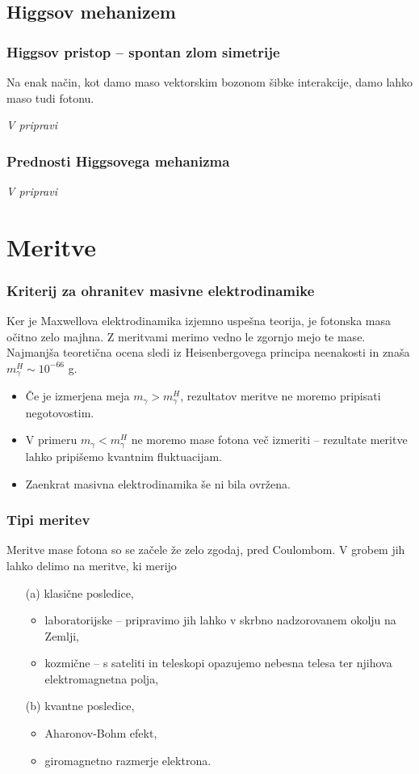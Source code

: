 \documentclass{beamer}
\begin{document}
\subsection{Higgsov mehanizem}

\begin{frame}[t]
	\frametitle{Higgsov pristop -- spontan zlom simetrije}
	Na enak način, kot damo maso vektorskim bozonom šibke interakcije, damo lahko maso tudi fotonu.
	

	\emph{V pripravi}
\end{frame}

\begin{frame}[t]
	\frametitle{Prednosti Higgsovega mehanizma}
	\emph{V pripravi}
\end{frame}

\section{Meritve}

\begin{frame}[t]
	\frametitle{Kriterij za ohranitev masivne elektrodinamike}
	Ker je Maxwellova elektrodinamika izjemno uspešna teorija, je fotonska masa očitno zelo majhna. Z meritvami merimo vedno
	le zgornjo mejo te mase. Najmanjša teoretična ocena sledi iz Heisenbergovega principa neenakosti in znaša $m^H_\gamma \sim 10^{-66}$ g.
	\begin{itemize}
		\item{Če je izmerjena meja $m_\gamma > m^H_\gamma$, rezultatov meritve ne moremo pripisati negotovostim.}
		\item{V primeru $m_\gamma < m^H_\gamma$ ne moremo mase fotona več izmeriti -- rezultate meritve lahko
			pripišemo kvantnim fluktuacijam.}
		\item{Zaenkrat masivna elektrodinamika še ni bila ovržena.}
	\end{itemize}
\end{frame}

\begin{frame}[t]
	\frametitle{Tipi meritev}
	Meritve mase fotona so se začele že zelo zgodaj, pred Coulombom. V grobem jih lahko delimo na meritve, ki merijo
	\begin{itemize}
		\item[(a)]{klasične posledice,}
			\begin{itemize}
				\item{laboratorijske -- pripravimo jih lahko v skrbno nadzorovanem okolju na Zemlji,}
				\item{kozmične -- s sateliti in teleskopi opazujemo nebesna telesa ter njihova elektromagnetna polja,}
			\end{itemize}
		\item[(b)]{kvantne posledice,}
			\begin{itemize}
				\item{Aharonov-Bohm efekt,}
				\item{giromagnetno razmerje elektrona.}
			\end{itemize}
	\end{itemize}
\end{frame}
\end{document}
